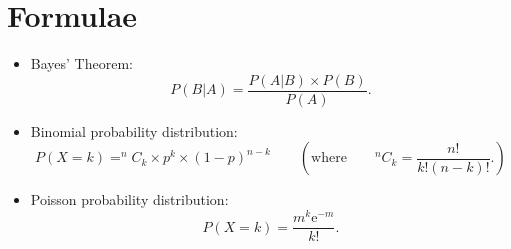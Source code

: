 \section*{Formulae}
\begin{itemize}




\item Bayes' Theorem:
\begin{equation*}
P(B|A)=\frac{P\left(A|B\right) \times P(B) }{P\left( A\right) }.
\end{equation*}



\item Binomial probability distribution:
\begin{equation*}
P(X = k) = ^{n}C_{k} \times p^{k} \times \left( 1-p\right) ^{n-k}\qquad \left( \text{where}\qquad
^{n}C_{k} =\frac{n!}{k!\left(n-k\right) !}. \right)
\end{equation*}

\item Poisson probability distribution:
\begin{equation*}
P(X = k) =\frac{m^{k}\mathrm{e}^{-m}}{k!}.
\end{equation*}
\end{itemize}

 